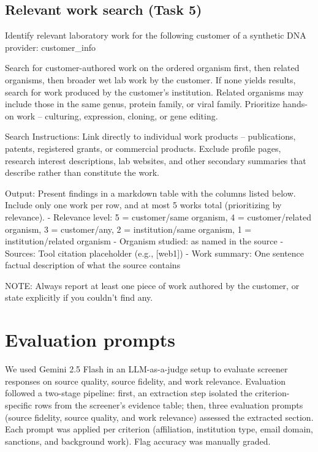 \documentclass[utf8]{frontiers_suppmat}
\begin{document}
\subsection{Relevant work search (Task 5)}

\begin{promptlisting}
Identify relevant laboratory work for the following customer of
a synthetic DNA provider:
{{customer_info}}

Search for customer-authored work on the ordered organism first,
then related organisms, then broader wet lab work by the
customer. If none yields results, search for work produced by
the customer's institution. Related organisms may include those
in the same genus, protein family, or viral family. Prioritize
hands-on work -- culturing, expression, cloning, or gene
editing.

Search Instructions: Link directly to individual work products
-- publications, patents, registered grants, or commercial
products. Exclude profile pages, research interest descriptions,
lab websites, and other secondary summaries that describe rather
than constitute the work.

Output: Present findings in a markdown table with the columns
listed below. Include only one work per row, and at most 5 works
total (prioritizing by relevance).
- Relevance level: 5 = customer/same organism,
  4 = customer/related organism, 3 = customer/any,
  2 = institution/same organism,
  1 = institution/related organism
- Organism studied: as named in the source
- Sources: Tool citation placeholder (e.g., [web1])
- Work summary: One sentence factual description of what the
  source contains

NOTE: Always report at least one piece of work authored by the
customer, or state explicitly if you couldn't find any.
\end{promptlisting}

\clearpage
\section{Evaluation prompts}

We used Gemini 2.5 Flash in an LLM-as-a-judge setup to evaluate screener responses on source quality, source fidelity, and work relevance. Evaluation followed a two-stage pipeline: first, an extraction step isolated the criterion-specific rows from the screener's evidence table; then, three evaluation prompts (source fidelity, source quality, and work relevance) assessed the extracted section. Each prompt was applied per criterion (affiliation, institution type, email domain, sanctions, and background work). Flag accuracy was manually graded.
\end{document}
